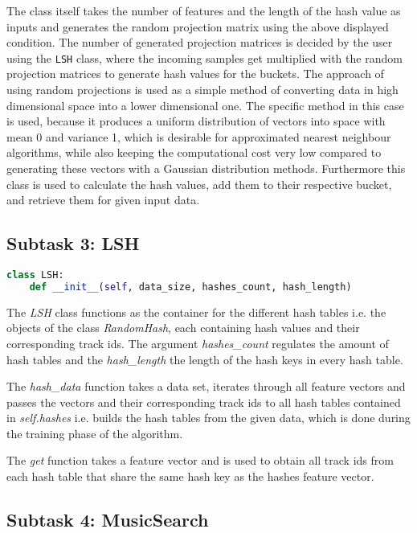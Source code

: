 \documentclass[11pt]{article}
\begin{document}
The class itself takes the number of features and the length of the hash value as inputs and generates the random projection matrix using the above displayed condition. The number of generated projection matrices is decided by the user using the \texttt{LSH} class, where the incoming samples get multiplied with the random projection matrices to generate hash values for the buckets. The approach of using random projections is used as a simple method of converting data in high dimensional space into a lower dimensional one. The specific method in this case is used, because it produces a uniform distribution of vectors into space with mean 0 and variance 1, which is desirable for approximated nearest neighbour algorithms, while also keeping the computational cost very low compared to generating these vectors with a Gaussian distribution methods. Furthermore this class is used to calculate the hash values, add them to their respective bucket, and retrieve them for given input data.

\subsection*{Subtask 3: LSH}

\begin{file}
\begin{lstlisting}[language=Python]
class LSH:
    def __init__(self, data_size, hashes_count, hash_length)
\end{lstlisting}
\end{file}

The \textit{LSH} class functions as the container for the different hash tables i.e. the objects of the class \textit{RandomHash}, each  containing hash values and their corresponding track ids. The argument \textit{hashes\_count} regulates the amount of hash tables and the \textit{hash\_length} the length of the hash keys in every hash table.

The \textit{hash\_data} function takes a data set, iterates through all feature vectors and passes the vectors and their corresponding track ids to all hash tables contained in\textit{ self.hashes }i.e. builds the hash tables from the given data, which is done during the training phase of the algorithm.

The \textit{get} function takes a feature vector and is used to obtain all track ids from each hash table that share the same hash key as the hashes feature vector. 

\subsection*{Subtask 4: MusicSearch}
\end{document}
